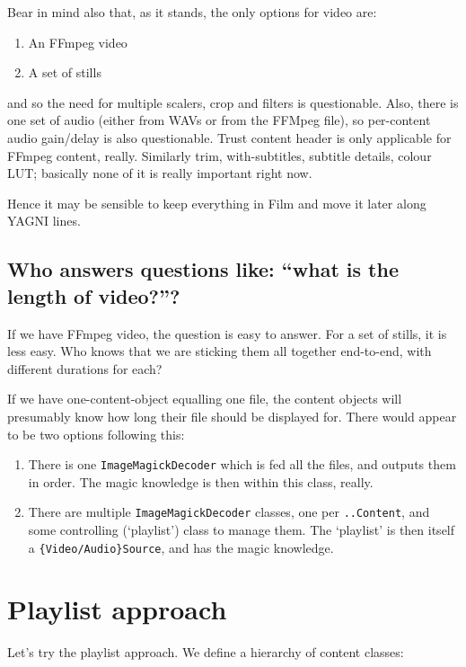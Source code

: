\documentclass{article}
\begin{document}
Bear in mind also that, as it stands, the only options for video are:

\begin{enumerate}
\item An FFmpeg video
\item A set of stills
\end{enumerate}

and so the need for multiple scalers, crop and filters is
questionable.  Also, there is one set of audio (either from WAVs or
from the FFMpeg file), so per-content audio gain/delay is also
questionable.  Trust content header is only applicable for FFmpeg
content, really.  Similarly trim, with-subtitles, subtitle details,
colour LUT; basically none of it is really important right now.

Hence it may be sensible to keep everything in Film and move it later
along YAGNI lines.


\subsection{Who answers questions like: ``what is the length of video?''?}

If we have FFmpeg video, the question is easy to answer.  For a set of
stills, it is less easy.  Who knows that we are sticking them all
together end-to-end, with different durations for each?

If we have one-content-object equalling one file, the content objects
will presumably know how long their file should be displayed for.
There would appear to be two options following this:

\begin{enumerate}
\item There is one \texttt{ImageMagickDecoder} which is fed all the
  files, and outputs them in order.  The magic knowledge is then
  within this class, really.
\item There are multiple \texttt{ImageMagickDecoder} classes, one per
  \texttt{..Content}, and some controlling (`playlist') class to manage
  them.  The `playlist' is then itself a
  \texttt{\{Video/Audio\}Source}, and has the magic knowledge.
\end{enumerate}


\section{Playlist approach}

Let's try the playlist approach.  We define a hierarchy of content classes:
\end{document}
